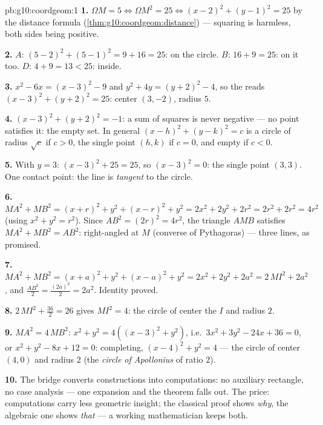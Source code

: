 \begin{solution}{pb:g10:coordgeom:1}
\textbf{1.} $\Omega M = 5 \iff \Omega M^2 = 25 \iff
(x - 2)^2 + (y - 1)^2 = 25$ by the distance formula
(\cref{thm:g10:coordgeom:distance}) --- squaring is harmless,
both sides being positive.

\textbf{2.} $A$: $(5-2)^2 + (5-1)^2 = 9 + 16 = 25$: on the
circle. $B$: $16 + 9 = 25$: on it too. $D$: $4 + 9 = 13 < 25$:
inside.

\textbf{3.} $x^2 - 6x = (x - 3)^2 - 9$ and
$y^2 + 4y = (y + 2)^2 - 4$, so the  reads
$(x - 3)^2 + (y + 2)^2 = 25$: center $(3, -2)$, radius $5$.

\textbf{4.} $(x - 3)^2 + (y + 2)^2 = -1$: a sum of squares is
never negative --- no point satisfies it: the empty set. In
general $(x - h)^2 + (y - k)^2 = c$ is a circle of radius
$\sqrt c$ if $c > 0$, the single point $(h, k)$ if $c = 0$, and
empty if $c < 0$.

\textbf{5.} With $y = 3$: $(x - 3)^2 + 25 = 25$, so
$(x - 3)^2 = 0$: the single point $(3, 3)$. One contact point:
the line is \emph{tangent} to the circle.

\textbf{6.} $MA^2 + MB^2 = (x + r)^2 + y^2 + (x - r)^2 + y^2
= 2x^2 + 2y^2 + 2r^2 = 2r^2 + 2r^2 = 4r^2$ (using
$x^2 + y^2 = r^2$). Since $AB^2 = (2r)^2 = 4r^2$, the triangle
$AMB$ satisfies $MA^2 + MB^2 = AB^2$: right-angled at $M$
(converse of Pythagoras) --- three lines, as promised.

\textbf{7.} $MA^2 + MB^2 = (x + a)^2 + y^2 + (x - a)^2 + y^2
= 2x^2 + 2y^2 + 2a^2 = 2\,MI^2 + 2a^2$, and
$\frac{AB^2}{2} = \frac{(2a)^2}{2} = 2a^2$. Identity proved.

\textbf{8.} $2\,MI^2 + \frac{36}{2} = 26$ gives $MI^2 = 4$: the
circle of center the  $I$ and radius $2$.

\textbf{9.} $MA^2 = 4\,MB^2$:
$x^2 + y^2 = 4\left((x - 3)^2 + y^2\right)$, i.e.\
$3x^2 + 3y^2 - 24x + 36 = 0$, or
$x^2 + y^2 - 8x + 12 = 0$: completing,
$(x - 4)^2 + y^2 = 4$ --- the circle of center $(4, 0)$ and
radius $2$ (the \emph{circle of Apollonius} of ratio $2$).

\textbf{10.} The bridge converts constructions into
computations: no auxiliary rectangle, no case analysis --- one
expansion and the theorem falls out. The price: computations
carry less geometric insight; the classical proof shows
\emph{why}, the algebraic one shows \emph{that} --- a working
mathematician keeps both.


\end{solution}
